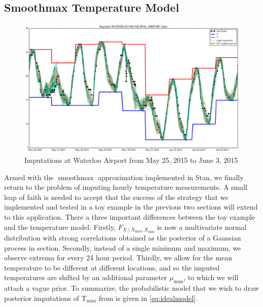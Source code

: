 \documentclass[letter]{article}
\makeatletter
\def\maxwidth{\ifdim\Gin@nat@width>\linewidth\linewidth
\else\Gin@nat@width\fi}
\let\Oldincludegraphics\includegraphics
\renewcommand{\includegraphics}[1]{\Oldincludegraphics[width=.8\maxwidth]{#1}}
\newcommand{\T}{\mathrm{T}}
\newcommand{\miss}{\mathrm{miss}}
\DeclareMathOperator*{\softmax}{smoothmax}
\newcommand{\Xmax}{X_{\max}}
\newcommand{\Xmin}{X_{\min}}
\newcommand{\Fcond}{F_{X \mid \Xmax,\Xmin}}
\makeatother
\begin{document}
        \subsection{Smoothmax Temperature Model}\label{smoothmax-temperature-model}

\begin{figure}
\centering
\includegraphics{figures/imputations_SEonly.png}
\caption{\label{fig:imputations_SEonly}Imputations at Waterloo Airport from May 25, 2015 to June 3, 2015}
\end{figure}

Armed with the \(\softmax\) approximation implemented in Stan, we finally return to the problem of imputing hourly temperature measurements.
A small leap of faith is needed to accept that the success of the strategy that we implemented and tested in a toy example in the previous two sections will extend to this application.
There a three important differences between the toy example and the temperature model.
Firstly, \(\Fcond\) is now a multivariate normal distribution with strong correlations obtained as the posterior of a Gaussian process in section.
Secondly, instead of a single minimum and maximum, we observe extrema for every 24 hour period.
Thirdly, we allow for the mean temperature to be different at different locations,
and so the imputed temperatures are shifted by an additional parameter \(\mu_{\miss}\),
to which we will attach a vague prior.
To summarize, the probabilistic model that we wish to draw posterior imputations of \(\T_\miss\) from is given in \eqref{eq:idealmodel}.
\end{document}
